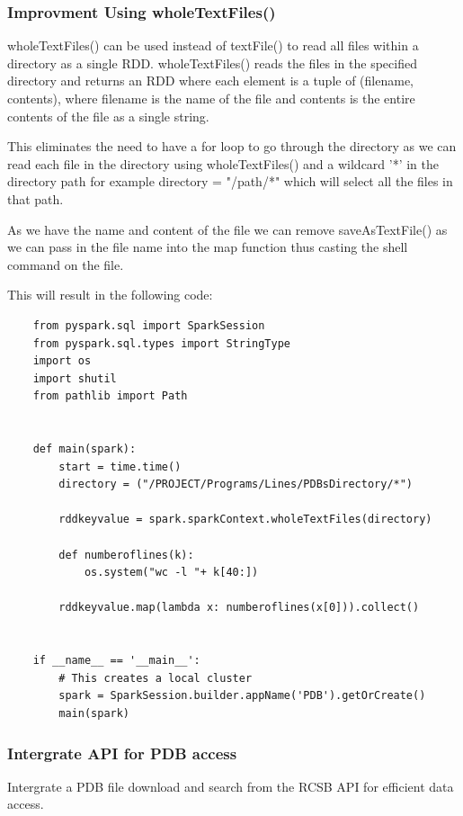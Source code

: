 \documentclass[]{final_report}
\begin{document}
\clearpage

\subsubsection{Improvment Using wholeTextFiles()}

wholeTextFiles() can be used instead of textFile() to read all files within a directory as a single RDD. wholeTextFiles() reads the files in the specified directory and returns an RDD where each element is a tuple of (filename, contents), where filename is the name of the file and contents is the entire contents of the file as a single string.

This eliminates the need to have a for loop to go through the directory as we can read each file in the directory using wholeTextFiles() and a wildcard '*' in the directory path for example directory = "/path/*" which will select all the files in that path.

As we have the name and content of the file we can remove saveAsTextFile() as we can pass in the file name into the map function thus casting the shell command on the file.

This will result in the following code:

\begin{lstlisting}
    from pyspark.sql import SparkSession
    from pyspark.sql.types import StringType
    import os
    import shutil
    from pathlib import Path


    def main(spark):
        start = time.time()
        directory = ("/PROJECT/Programs/Lines/PDBsDirectory/*")

        rddkeyvalue = spark.sparkContext.wholeTextFiles(directory)

        def numberoflines(k):
            os.system("wc -l "+ k[40:])
        
        rddkeyvalue.map(lambda x: numberoflines(x[0])).collect()


    if __name__ == '__main__':
        # This creates a local cluster
        spark = SparkSession.builder.appName('PDB').getOrCreate()
        main(spark)
\end{lstlisting}

\clearpage

\subsubsection{Intergrate API for PDB access}
\begin{displayquote}
    Intergrate a PDB file download and search from the RCSB API for efficient data access.
\end{displayquote}
\end{document}
